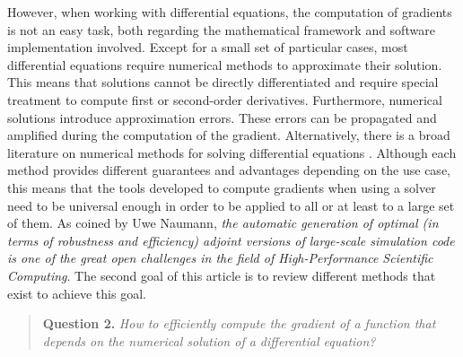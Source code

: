 However, when working with differential equations, the computation of gradients is not an easy task, both regarding the mathematical framework and software implementation involved. 
Except for a small set of particular cases, most differential equations require numerical methods to approximate their solution.
This means that solutions cannot be directly differentiated and require special treatment to compute first or second-order derivatives. 
Furthermore, numerical solutions introduce approximation errors. 
These errors can be propagated and amplified during the computation of the gradient. 
Alternatively, there is a broad literature on numerical methods for solving differential equations \cite{hairer-solving-1, hairer-solving-2}. 
Although each method provides different guarantees and advantages depending on the use case, this means that the tools developed to compute gradients when using a solver need to be universal enough in order to be applied to all or at least to a large set of them. 
As coined by Uwe Naumann, \textit{the automatic generation of optimal (in terms of robustness and efficiency) adjoint versions of large-scale simulation code is one of the great open challenges in the field of High-Performance Scientific Computing}\cite{Naumann.2011}.
The second goal of this article is to review different methods that exist to achieve this goal.
\begin{quote}
    \textbf{Question 2. }
    \textit{How to efficiently compute the gradient of a function that depends on the numerical solution of a differential equation?}
\end{quote}

